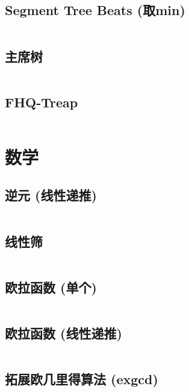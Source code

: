 \documentclass{article}
\begin{document}
\subsection{Segment Tree Beats (取min)}
\inputminted[breaklines, frame=single]{c++}{../algo/数据结构/SGB【区间取min】.cpp}


\subsection{主席树}
\inputminted[breaklines, frame=single]{c++}{../algo/数据结构/主席树.cpp}

\subsection{FHQ-Treap}
\inputminted[breaklines, frame=single]{c++}{../algo/数据结构/权值无旋Treap.cpp}




\section{数学}
\subsection{逆元 (线性递推)}
\inputminted[breaklines, frame=single]{c++}{../algo/数学/逆元【O(n)预处理】.cpp}

\subsection{线性筛}
\inputminted[breaklines, frame=single]{c++}{../algo/数学/欧拉筛.cpp}


\subsection{欧拉函数 (单个)}
\inputminted[breaklines, frame=single]{c++}{../algo/数学/欧拉函数【O(sqrt n)单个】.cpp}

\subsection{欧拉函数 (线性递推)}
\inputminted[breaklines, frame=single]{c++}{../algo/数学/欧拉函数【O(n)预处理】.cpp}

\subsection{拓展欧几里得算法 (exgcd)}
\inputminted[breaklines, frame=single]{c++}{../algo/数学/exgcd.cpp}
\end{document}
